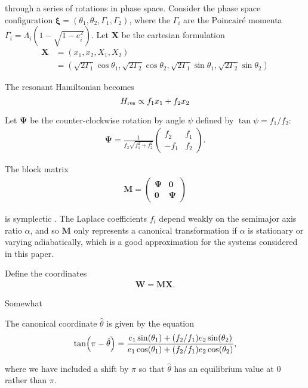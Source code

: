 \documentclass{mnras}
\renewcommand{\v}[1]{\boldsymbol{ #1 }}
\DeclarePairedDelimiter{\p}{(}{)}
\begin{document}
through a series of rotations in phase space.  Consider the phase
space configuration \(\v\xi=(\theta_1, \theta_2, \Gamma_1, \Gamma_2)\),
where the \(\Gamma_i\) are the \(\text{Poincair\'e}\) momenta
\(\Gamma_i=\Lambda_i(1-\sqrt{1-e_i^2})\).
Let \(\v X\) be the cartesian
formulation
\begin{align}
  \v X &= (x_1, x_2, X_1, X_2)\nonumber\\
  &= (\sqrt{2\Gamma_1}\cos\theta_1, \sqrt{2\Gamma_2}\cos\theta_2,
    \sqrt{2\Gamma_1}\sin\theta_1, \sqrt{2\Gamma_2}\sin\theta_2)
\end{align}

The resonant Hamiltonian becomes
\[ H_{\rm res} \propto f_1 x_1 + f_2 x_2 \]

Let \(\v \Psi\) be the
counter-clockwise rotation by angle \(\psi\) defined by \(\tan\psi=
f_1/f_2\):
\begin{align}
  \v \Psi = \frac{1}{f_2\sqrt{f_1^2+f_2^2}} 
  \begin{pmatrix}
    f_2 & f_1 \\
    -f_1 & f_2 
  \end{pmatrix}.
\end{align}

The block matrix
\begin{align}
  \v M =
  \begin{pmatrix}
    \v \Psi & \v 0 \\
    \v 0 & \v \Psi
  \end{pmatrix}
\end{align}

is symplectic \cite{goldstein_classical_2000}.  The Laplace coefficients
\(f_i\) depend weakly on the semimajor axis ratio \(\alpha\), and so \(\v
M\) only represents a canonical transformation if \(\alpha\) is
stationary or varying adiabatically, which is a good approximation
for the systems considered in this paper.

Define the coordinates
\begin{align}
  \v W = \v M \v X.
\end{align}

Somewhat 

The canonical coordinate \(\hat{\theta}\) is given by the equation
\begin{align}
\label{hattheta}
  \tan\p*{\pi-\hat{\theta}} = \frac{e_1\sin(\theta_1)
  + (f_2/f_1)e_2\sin(\theta_2)}{e_1\cos(\theta_1) + (f_2/f_1)e_2\cos(\theta_2)},
\end{align}

where we have included a shift by \(\pi\) so that \(\hat{\theta}\) has an
equilibrium value at \(0\) rather than \(\pi\).
\end{document}
